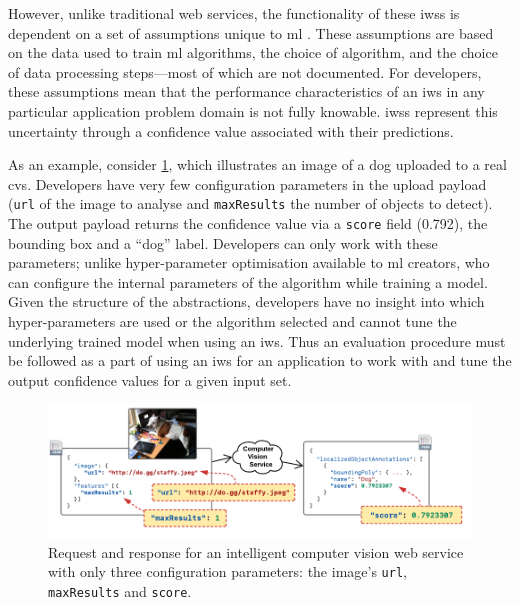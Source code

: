 However, unlike traditional web services, the functionality of these \glspl{iws} is dependent on a set of assumptions unique to \gls{ml} \citep{Cummaudo:2019icsme}. These assumptions are based on the data used to train \gls{ml} algorithms, the choice of algorithm, and the choice of data processing steps---most of which are not documented. For developers, these assumptions mean that the performance characteristics of an \gls{iws} in any particular application problem domain is not fully knowable. \Glspl{iws} represent this uncertainty through a confidence value associated with their predictions. 

As an example, consider \cref{fse-demo2020:fig:dog-example}, which illustrates an image of a dog uploaded to a real \gls{cvs}. Developers have very few configuration parameters in the upload payload (\texttt{url} of the image to analyse and \texttt{maxResults} the number of objects to detect). The  output payload returns the confidence value via a \texttt{score} field (0.792), the bounding box and a ``dog'' label. Developers can only work with these parameters; unlike hyper-parameter optimisation available to \gls{ml} creators, who can configure the internal parameters of the algorithm while training a model. Given the structure of the abstractions, developers have no insight into which hyper-parameters are used or the algorithm selected and cannot tune the underlying trained model when using an \gls{iws}. %
Thus an evaluation procedure must be followed as a part of using an \gls{iws} for an application to work with and tune the output confidence values for a given input set.


\begin{figure}[t]
    \includegraphics[width=\linewidth]{dog-example.pdf}
    \caption[Request and response for computer vision services provide limited configurability]{Request and response for an intelligent computer vision web service with only three configuration parameters: the image's \texttt{url}, \texttt{maxResults} and \texttt{score}.}
    \label{fse-demo2020:fig:dog-example}
\end{figure}

